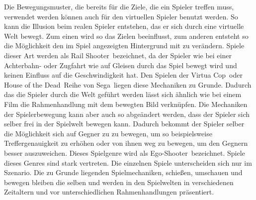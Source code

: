 Die Bewegungsmuster, die bereits für die Ziele, die ein Spieler treffen muss, verwendet werden können auch für den virtuellen Spieler benutzt werden. So kann die Illusion beim realen Spieler entstehen, das er sich durch eine virtuelle Welt bewegt. Zum einen wird so das Zielen beeinflusst, zum anderen entsteht so die Möglichkeit den im Spiel angezeigten Hintergrund mit zu verändern. Spiele dieser Art werden als \glqq Rail Shooter\grqq\ bezeichnet, da der Spieler wie bei einer Achterbahn- oder Zugfahrt wie auf Gleisen durch das Spiel bewegt wird und keinen Einfluss auf die Geschwindigkeit hat. Den Spielen der \glqq Virtua Cop\grqq\ oder \glqq House of the Dead\grqq\ Reihe von \glqq Sega\grqq\ liegen diese Mechaniken zu Grunde. Dadurch das die Spieler durch die Welt geführt werden lässt sich ähnlich wie bei einem Film die Rahmenhandlung mit dem bewegten Bild verknüpfen. Die Mechaniken der Spielerbewegung kann aber auch so abgeändert werden, dass der Spieler sich selber frei in der Spielwelt bewegen kann. Dadurch bekommt der Spieler selber die Möglichkeit sich auf Gegner zu zu bewegen, um so beispielsweise Treffergenauigkeit zu erhöhen oder von ihnen weg zu bewegen, um den Gegnern besser auszuweichen. Dieses Spielgenre wird als \glqq Ego-Shooter\grqq\ bezeichnet. Spiele dieses Genres sind stark vertreten. Die einzelnen Spiele unterscheiden sich nur im Szenario. Die zu Grunde liegenden Spielmechaniken, schießen, umschauen und bewegen bleiben die selben und werden in den Spielwelten in verschiedenen Zeitaltern und vor unterschiedlichen Rahmenhandlungen präsentiert. \cite[S. 50 f.]{Adams:1515529}



